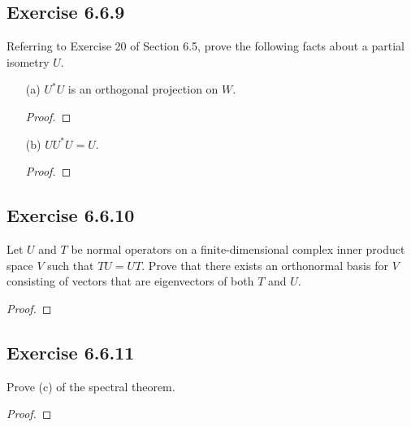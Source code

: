 \subsection*{Exercise 6.6.9} Referring to Exercise 20 of Section 6.5, prove the following facts about a partial isometry \( U \). 
\begin{enumerate}
    \item[(a)] \( U^{*} U  \) is an orthogonal projection on \( W  \).
        \begin{proof}
        
        \end{proof}
    \item[(b)] \( U U^{*} U = U  \).
        \begin{proof}
        
        \end{proof}
\end{enumerate}

\subsection*{Exercise 6.6.10} Let \( U \) and \( T  \) be normal operators on a finite-dimensional complex inner product space \( V  \) such that \( TU = UT  \). Prove that there exists an orthonormal basis for \( V  \) consisting of vectors that are eigenvectors of both \( T  \) and \( U  \).
\begin{proof}

\end{proof}

\subsection*{Exercise 6.6.11} Prove (c) of the spectral theorem.
\begin{proof}

\end{proof}

